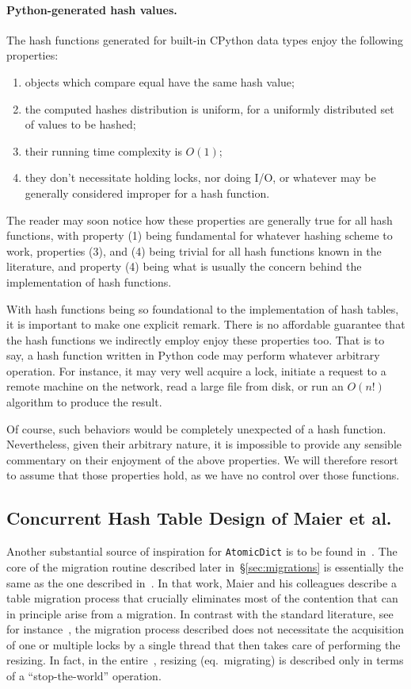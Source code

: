 \paragraph{Python-generated hash values.}
The hash functions generated for built-in CPython data types enjoy the following properties:
\begin{enumerate}
	\item objects which compare equal have the same hash value;
	\item the computed hashes distribution is uniform, for a uniformly distributed set of values to be hashed;
	\item their running time complexity is $O(1)$;
	\item they don't necessitate holding locks, nor doing I/O, or whatever may be generally considered improper for a hash function\@.
\end{enumerate}
The reader may soon notice how these properties are generally true for all hash functions, with property (1) being fundamental for whatever hashing scheme to work, properties (3), and (4) being trivial for all hash functions known in the literature, and property (4) being what is usually the concern behind the implementation of hash functions.

With hash functions being so foundational to the implementation of hash tables, it is important to make one explicit remark.
There is no affordable guarantee that the hash functions we indirectly employ enjoy these properties too.
That is to say, a hash function written in Python code may perform whatever arbitrary operation.
For instance, it may very well acquire a lock, initiate a request to a remote machine on the network, read a large file from disk, or run an $O(n!)$ algorithm to produce the result.

Of course, such behaviors would be completely unexpected of a hash function.
Nevertheless, given their arbitrary nature, it is impossible to provide any sensible commentary on their enjoyment of the above properties.
We will therefore resort to assume that those properties hold, as we have no control over those functions.


\subsection{Concurrent Hash Table Design of Maier et al.}\label{subsec:maier}

Another substantial source of inspiration for \texttt{AtomicDict} is to be found in~\cite{maier}.
The core of the migration routine described later in~\S\ref{sec:migrations} is essentially the same as the one described in~\cite[\S5.3]{maier}.
In that work, Maier and his colleagues describe a table migration process that crucially eliminates most of the contention that can in principle arise from a migration.
In contrast with the standard literature, see for instance~\cite[Figure~13.30]{art-mp}, the migration process described does not necessitate the acquisition of one or multiple locks by a single thread that then takes care of performing the resizing.
In fact, in the entire~\cite[Chapter~13]{art-mp}, resizing (eq.\ migrating) is described only in terms of a ``stop-the-world'' operation.

